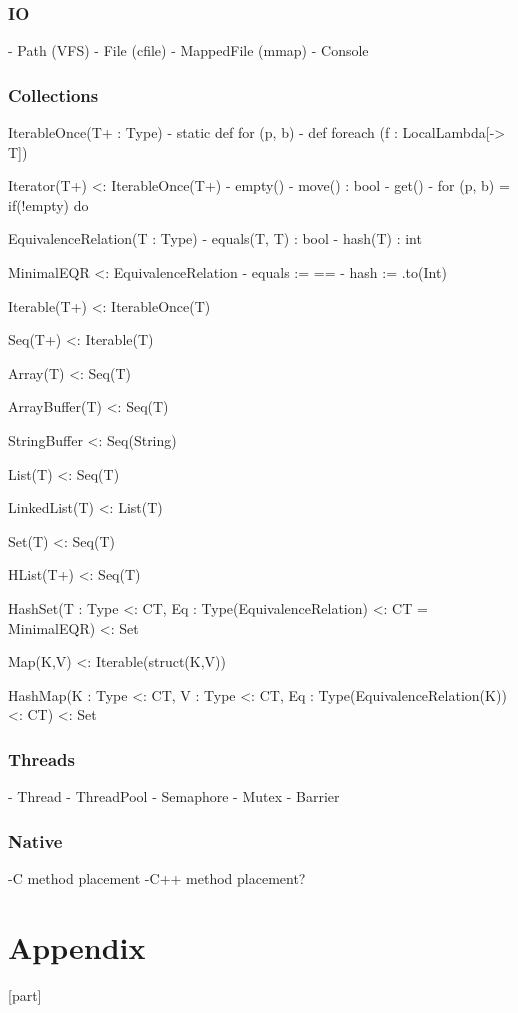 \documentclass[a4paper,10pt]{article}
\begin{document}
\section{IO}

 - Path (VFS)
 - File (cfile)
 - MappedFile (mmap)
 - Console


\section{Collections}

IterableOnce(T+ : Type)
- static def for (p, b)
- def foreach (f : LocalLambda[-> T])

Iterator(T+) <: IterableOnce(T+)
- empty()
- move() : bool
- get()
- for (p, b) = if(!empty) do {}

EquivalenceRelation(T : Type)
- equals(T, T) : bool
- hash(T) : int

MinimalEQR <: EquivalenceRelation
- equals := ==
- hash := .to(Int)

Iterable(T+) <: IterableOnce(T)

Seq(T+) <: Iterable(T)

Array(T) <: Seq(T)

ArrayBuffer(T) <: Seq(T)

StringBuffer <: Seq(String)

List(T) <: Seq(T)

LinkedList(T) <: List(T)

Set(T) <: Seq(T)

HList(T+) <: Seq(T)


HashSet(T : Type <: CT, Eq : Type(EquivalenceRelation) <: CT = MinimalEQR) <: Set

Map(K,V) <: Iterable(struct(K,V))

HashMap(K : Type <: CT, V : Type <: CT, Eq : Type(EquivalenceRelation(K)) <: CT) <: Set

\section{Threads}

- Thread
- ThreadPool
- Semaphore
- Mutex
- Barrier

\section{Native}

-C method placement
-C++ method placement?



\newpage
\part{Appendix}
[part]
\renewcommand{\thesection}{\Alph{myc}}
\let\osection\section
\renewenvironment{section}{\stepcounter{myc}\osection}

\newpage
\printglossaries

\small{
    
    
}

\todos
\end{document}
